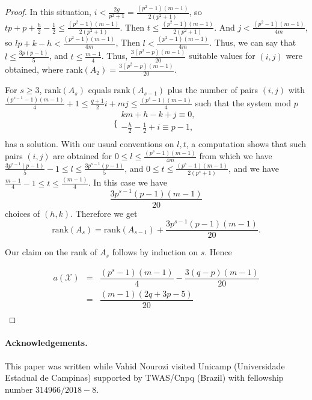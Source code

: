 \begin{proof}
In this situation, $i < \frac{2g}{p^2+1}=\frac{(p^2-1)(m-1)}{2(p^2+1)}$, so $tp+p+\frac{h}{2}-\frac{1}{2} \leq \frac{(p^2-1)(m-1)}{2(p^2+1)}$. Then $t\leq \frac{(p^2-1)(m-1)}{2(p^2+1)}$. And $j < \frac{(p^2-1)(m-1)}{4m}$, so $lp + k-h<\frac{(p^2-1)(m-1)}{4m}$, Then $l<\frac{(p^2-1)(m-1)}{4m}$. Thus, we can say that $ l \leq \frac{3p(p-1)}{5}$, and $t \leq \frac{m-1}{4}$. Thus, $\frac{3(p^2-p)(m-1)}{20}$ suitable values for $(i, j)$ were obtained, where $\mbox{rank}(A_2) =\frac{3(p^2-p)(m-1)}{20}$.





 For $s \geq 3$, $\mbox{rank}(A_s)$ equals $\mbox{rank}(A_{s-1})$ plus the number of pairs $(i, j)$ with $\frac{(p^{s-1} -1)(m-1)}{4}+1\leq \frac{q+1}{2}i+ mj \leq \frac{(p^{s} -1)(m-1)}{4}$ such that the system mod $p$
  \begin{equation*}
\Bigg\{
             \begin{array}{c}
             km+ h-k+j \equiv 0,\\
              -\frac{h}{2} - \frac{1}{2} + i \equiv p-1, \\
             \end{array}
\end{equation*}
has a solution. With our usual conventions on $l, t$, a computation shows that such pairs $(i, j)$ are obtained for $0 \leq l \leq \frac{(p^s-1)(m-1)}{4m}$ from which we have $\frac{3p^{s-1}(p-1)}{5} -1 \leq l \leq \frac{3p^{s-1}(p-1)}{5}$, and $0 \leq t\leq \frac{(p^s-1)(m-1)}{2(p^s+1)}$, and we have $\frac{m-1}{4}-1 \leq t \leq \frac{(m-1)}{4}$. In this case we have
$$\frac{3p^{s-1}(p-1)(m-1)}{20}$$
choices of $(h, k)$. Therefore we get
$$\mbox{rank}(A_s)= \mbox{rank}(A_{s-1})+ \frac{3p^{s-1}(p-1)(m-1)}{20}.$$

Our claim on the rank of $A_s$ follows by induction on $s$. Hence



  \begin{equation*}
  \begin{array}{ccccccc}
              a(\mathcal{X}) &=& \dfrac{(p^s-1)(m-1)}{4} - \dfrac{3(q-p)(m-1)}{20}  \\
              &=& \dfrac{(m-1)(2q+3p-5)}{20} \\
             \end{array}
\end{equation*}
\end{proof}

\paragraph*{\textbf{Acknowledgements.}}
This paper was written while Vahid Nourozi visited Unicamp (Universidade Estadual de Campinas) supported by TWAS/Cnpq (Brazil) with fellowship number $314966/2018-8$.


